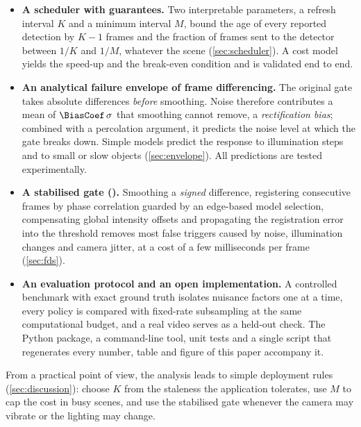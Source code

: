 \begin{itemize}
\item \textbf{A scheduler with guarantees.} Two interpretable parameters, a refresh interval $K$ and a minimum interval $M$, bound the age of every reported detection by $K-1$ frames and the fraction of frames sent to the detector between $1/K$ and $1/M$, whatever the scene (\cref{sec:scheduler}). A cost model yields the speed-up and the break-even condition and is validated end to end.
\item \textbf{An analytical failure envelope of frame differencing.} The original gate takes absolute differences \emph{before} smoothing. Noise therefore contributes a mean of $\BiasCoef\,\sigma$ that smoothing cannot remove, a \emph{rectification bias}; combined with a percolation argument, it predicts the noise level at which the gate breaks down. Simple models predict the response to illumination steps and to small or slow objects (\cref{sec:envelope}). All predictions are tested experimentally.
\item \textbf{A stabilised gate (\FDS).} Smoothing a \emph{signed} difference, registering consecutive frames by phase correlation guarded by an edge-based model selection, compensating global intensity offsets and propagating the registration error into the threshold removes most false triggers caused by noise, illumination changes and camera jitter, at a cost of a few milliseconds per frame (\cref{sec:fds}).
\item \textbf{An evaluation protocol and an open implementation.} A controlled benchmark with exact ground truth isolates nuisance factors one at a time, every policy is compared with fixed-rate subsampling at the same computational budget, and a real video serves as a held-out check. The Python package, a command-line tool, unit tests and a single script that regenerates every number, table and figure of this paper accompany it.
\end{itemize}

\noindent From a practical point of view, the analysis leads to simple deployment rules (\cref{sec:discussion}): choose $K$ from the staleness the application tolerates, use $M$ to cap the cost in busy scenes, and use the stabilised gate whenever the camera may vibrate or the lighting may change.
